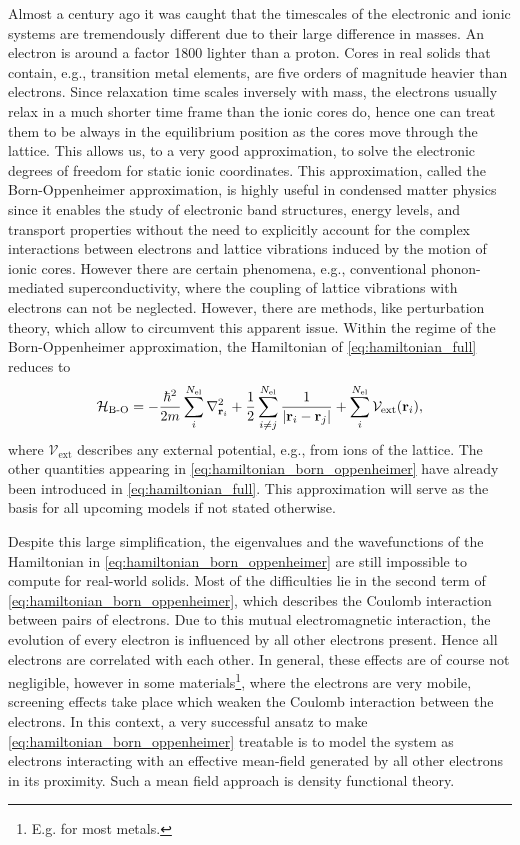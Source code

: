 \documentclass[../../main.tex]{subfiles}
\begin{document}
Almost a century ago it was caught that the timescales of the electronic and ionic systems are tremendously different due to their large difference in masses. An electron is around a factor 1800 lighter than a proton. Cores in real solids that contain, e.g., transition metal elements, are five orders of magnitude heavier than electrons. Since relaxation time scales inversely with mass, the electrons usually relax in a much shorter time frame than the ionic cores do, hence one can treat them to be always in the equilibrium position as the cores move through the lattice. This allows us, to a very good approximation, to solve the electronic degrees of freedom for static ionic coordinates. This approximation, called the Born-Oppenheimer approximation, is highly useful in condensed matter physics since it enables the study of electronic band structures, energy levels, and transport properties without the need to explicitly account for the complex interactions between electrons and lattice vibrations induced by the motion of ionic cores. However there are certain phenomena, e.g., conventional phonon-mediated superconductivity, where the coupling of lattice vibrations with electrons can not be neglected. However, there are methods, like perturbation theory, which allow to circumvent this apparent issue. Within the regime of the Born-Oppenheimer approximation, the Hamiltonian of \eqref{eq:hamiltonian_full} reduces to
\begin{align}\label{eq:hamiltonian_born_oppenheimer}
	\mathcal{H}_{\text{B-O}}=-\frac{\hbar^2}{2m}\sum_i^{N_{\text{el}}} \nabla^2_{\textbf{r}_i}+\frac 12\sum_{i\neq j}^{N_{\text{el}}} \frac{1}{|\textbf{r}_i-\textbf{r}_j|}+\sum_i^{N_{\text{el}}}\mathcal{V}_{\text{ext}}(\textbf{r}_i),
\end{align}
where $\mathcal{V}_{\text{ext}}$ describes any external potential, e.g., from ions of the lattice. The other quantities appearing in \eqref{eq:hamiltonian_born_oppenheimer} have already been introduced in \eqref{eq:hamiltonian_full}. This approximation will serve as the basis for all upcoming models if not stated otherwise.

Despite this large simplification, the eigenvalues and the wavefunctions of the Hamiltonian in \eqref{eq:hamiltonian_born_oppenheimer} are still impossible to compute for real-world solids. Most of the difficulties lie in the second term of \eqref{eq:hamiltonian_born_oppenheimer}, which describes the Coulomb interaction between pairs of electrons. Due to this mutual electromagnetic interaction, the evolution of every electron is influenced by all other electrons present. Hence all electrons are correlated with each other. In general, these effects are of course not negligible, however in some materials\footnote{E.g. for most metals.}, where the electrons are very mobile, screening effects take place which weaken the Coulomb interaction between the electrons. In this context, a very successful ansatz to make \eqref{eq:hamiltonian_born_oppenheimer} treatable is to model the system as electrons interacting with an effective mean-field generated by all other electrons in its proximity. Such a mean field approach is density functional theory. 
\end{document}
